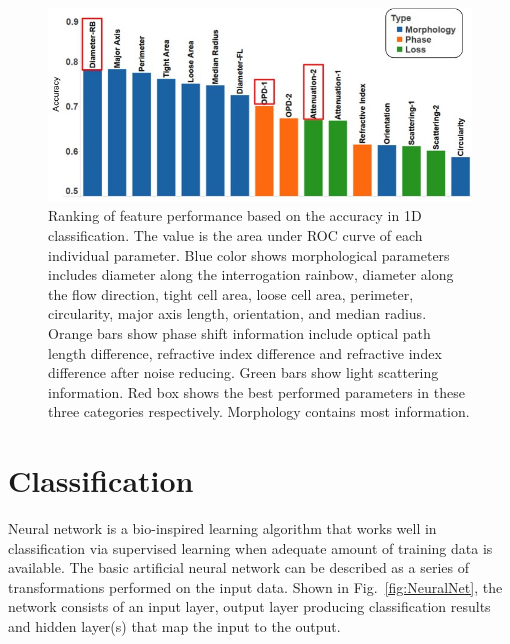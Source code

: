 \documentclass[aps,pra,preprint,superscriptaddress]{revtex4-1}
\begin{document}
\begin{figure}
\includegraphics[scale=0.55]{FigureFeaturesRank.jpg}
\caption{\label{fig:FeaturesRank} Ranking of feature performance based on the accuracy in 1D classification. The value is the area under ROC curve of each individual parameter. Blue color shows morphological parameters includes diameter along the interrogation rainbow, diameter along the flow direction, tight cell area, loose cell area, perimeter, circularity, major axis length, orientation, and median radius. Orange bars show phase shift information include optical path length difference, refractive index difference and refractive index difference after noise reducing. Green bars show light scattering information. Red box shows the best performed parameters in these three categories respectively. Morphology contains most information. }
\end{figure}

\section{Classification}

Neural network is a bio-inspired learning algorithm that works well in classification via supervised learning when adequate amount of training data is available. The basic artificial neural network can be described as a series of transformations performed on the input data. Shown in Fig.~\ref{fig:NeuralNet}, the network consists of an input layer, output layer producing classification results and hidden layer(s) that map the input to the output. 
\end{document}
